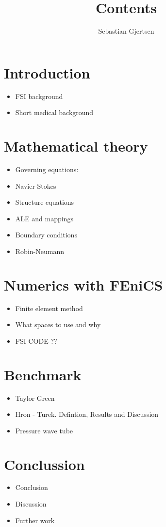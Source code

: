 
\usepackage{listings}
\usepackage{amsmath}
\title{Contents}
\author{Sebastian Gjertsen}

\maketitle

\section{Introduction}
\begin{itemize}
\item FSI background 
\item Short medical background
\end{itemize}

\section{Mathematical theory}
\begin{itemize}
\item Governing equations:
\item Navier-Stokes
\item Structure equations
\item ALE and mappings
\item Boundary conditions
\item Robin-Neumann
\end{itemize}

\section{Numerics with FEniCS}
\begin{itemize}
\item Finite element method
\item What spaces to use and why
\item FSI-CODE ??
\end{itemize}

\section{Benchmark}
\begin{itemize}
\item Taylor Green
\item Hron - Turek. Defintion, Results and Discussion 
\item Pressure wave tube
\end{itemize}


\section{Conclussion}
\begin{itemize}
\item Conclusion
\item Discussion
\item Further work 
\end{itemize}




